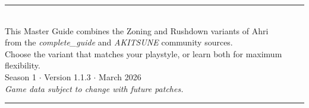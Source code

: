 \documentclass[12pt, a4paper]{report}
\begin{document}
\begin{tcolorbox}[
  colback=ahriDeepBlue, colframe=ahriBlue!40,
  arc=6pt, boxrule=0.8pt,
  left=18pt, right=18pt, top=10pt, bottom=10pt,
  width=0.82\linewidth, center
]
  \centering
  \textcolor{ahriBlue!60}{\rule{0.5\linewidth}{0.4pt}}\\[0.6em]
  \textcolor{ahriGray}{\small\sffamily
    This Master Guide combines the Zoning and Rushdown variants of Ahri\\
    from the \textit{complete\_guide} and \textit{AKITSUNE} community sources.\\[4pt]
    Choose the variant that matches your playstyle, or learn both for maximum flexibility.
  }\\[4pt]
  \textcolor{ahriGold}{\footnotesize\sffamily Season 1 $\cdot$ Version 1.1.3 $\cdot$ March 2026}\\[4pt]
  \textcolor{ahriGray!60}{\footnotesize\itshape Game data subject to change with future patches.}\\[0.6em]
  \textcolor{ahriBlue!60}{\rule{0.5\linewidth}{0.4pt}}
\end{tcolorbox}

\vspace{0.5cm}
\end{document}
